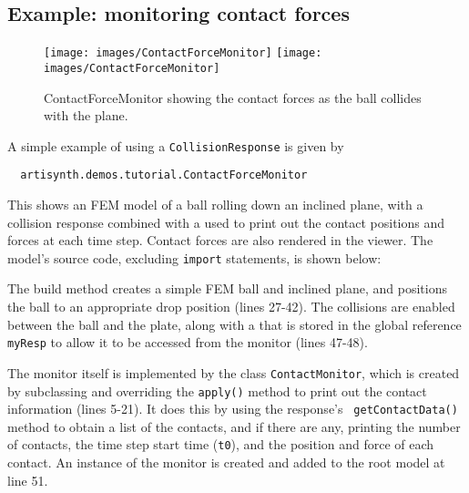 \subsection{Example: monitoring contact forces}
\label{contactForceMonitor:sec}

\begin{figure}[ht]
\begin{center}
\iflatexml
 \texttt{[image: images/ContactForceMonitor]}
\else
 \texttt{[image: images/ContactForceMonitor]}
\fi
\end{center}
\caption {ContactForceMonitor showing the contact forces as
the ball collides with the plane.}
\label{ContactForceMonitor:fig}
\end{figure}

A simple example of using a {\tt CollisionResponse} is given by
%
\begin{verbatim}
  artisynth.demos.tutorial.ContactForceMonitor
\end{verbatim}
%
This shows an FEM model of a ball rolling down an inclined plane,
with a collision response combined with a 
used to print out the contact positions and forces at each time step.
Contact forces are also rendered in the viewer.  The model's source
code, excluding {\tt import} statements, is shown below:

\lstset{numbers=left} 
\iflatexml

\else

\fi
\lstset{numbers=none}

The build method creates a simple FEM ball and inclined plane, and
positions the ball to an appropriate drop position (lines 27-42).  The
collisions are enabled between the ball and the plate, along
with a 
that is stored in the global reference {\tt myResp} to allow it to be
accessed from the monitor (lines 47-48). 

The monitor itself is implemented by the class {\tt ContactMonitor},
which is created by subclassing
and overriding the {\tt apply()} method to print out the contact
information (lines 5-21). It does this by using the response's {\tt
getContactData()} method to obtain a list of the contacts, and if
there are any, printing the number of contacts, the time step start
time ({\tt t0}), and the position and force of each contact.  An
instance of the monitor is created and added to the root model at line
51.

